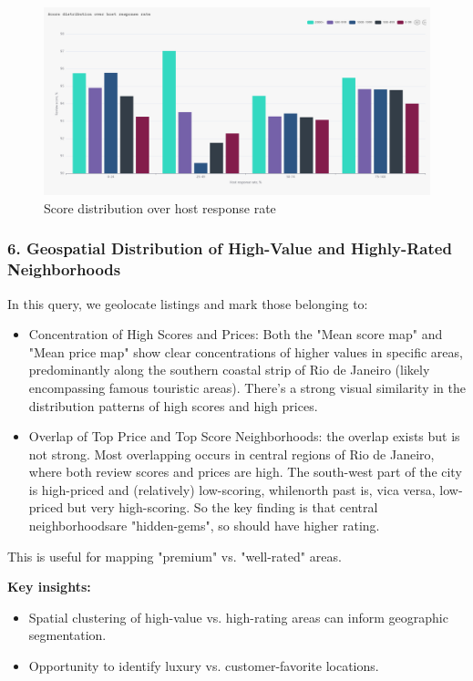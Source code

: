 \vspace{1em}
\begin{figure}[H]
    \centering
    \includegraphics[width=1\textwidth]{images/q5_2.jpg}
    \caption{Score distribution over host response rate}
    \label{fig:figureq10}
\end{figure}


\subsubsection*{6. Geospatial Distribution of High-Value and Highly-Rated Neighborhoods}

In this query, we geolocate listings and mark those belonging to:
\begin{itemize}
    \item Concentration of High Scores and Prices: Both the "Mean score map" and "Mean price map" show clear concentrations of higher values in specific areas, predominantly along the southern coastal strip of Rio de Janeiro (likely encompassing famous touristic areas). There's a strong visual similarity in the distribution patterns of high scores and high prices.
    \item Overlap of Top Price and Top Score Neighborhoods: the overlap exists but is not strong. Most overlapping occurs in central regions of Rio de Janeiro, where both review scores and prices are high. The south-west part of the city is high-priced and (relatively) low-scoring, whilenorth past is, vica versa, low-priced but very high-scoring. So the key finding is that central neighborhoodsare "hidden-gems", so should have higher rating.
\end{itemize}

This is useful for mapping "premium" vs. "well-rated" areas.

\vspace{0.5em}
\textbf{Key insights:}
\begin{itemize}
    \item Spatial clustering of high-value vs. high-rating areas can inform geographic segmentation.
    \item Opportunity to identify luxury vs. customer-favorite locations.
\end{itemize}

